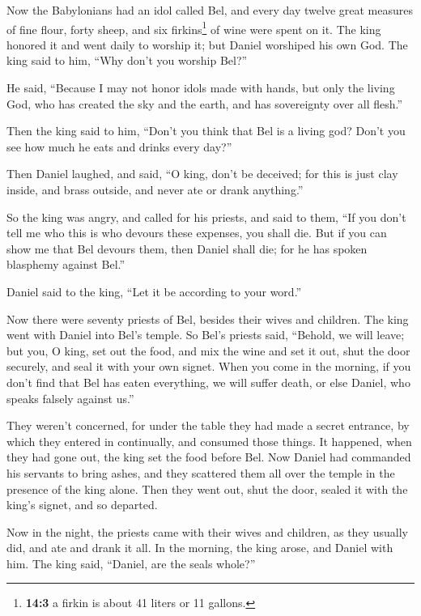  Now the Babylonians had an idol called Bel, and every day
twelve great measures of fine flour, forty sheep, and six
firkins\footnote{\textbf{14:3} a firkin is about 41 liters or 11
  gallons.} of wine were spent on it.  The king honored it
and went daily to worship it; but Daniel worshiped his own God. The king
said to him, ``Why don't you worship Bel?''

 He said, ``Because I may not honor idols made with hands,
but only the living God, who has created the sky and the earth, and has
sovereignty over all flesh.''

 Then the king said to him, ``Don't you think that Bel is
a living god? Don't you see how much he eats and drinks every day?''

 Then Daniel laughed, and said, ``O king, don't be
deceived; for this is just clay inside, and brass outside, and never ate
or drank anything.''

 So the king was angry, and called for his priests, and
said to them, ``If you don't tell me who this is who devours these
expenses, you shall die.  But if you can show me that Bel
devours them, then Daniel shall die; for he has spoken blasphemy against
Bel.''

Daniel said to the king, ``Let it be according to your word.''

 Now there were seventy priests of Bel, besides their
wives and children. The king went with Daniel into Bel's temple.
 So Bel's priests said, ``Behold, we will leave; but you,
O king, set out the food, and mix the wine and set it out, shut the door
securely, and seal it with your own signet.  When you
come in the morning, if you don't find that Bel has eaten everything, we
will suffer death, or else Daniel, who speaks falsely against us.''

 They weren't concerned, for under the table they had
made a secret entrance, by which they entered in continually, and
consumed those things.  It happened, when they had gone
out, the king set the food before Bel. Now Daniel had commanded his
servants to bring ashes, and they scattered them all over the temple in
the presence of the king alone. Then they went out, shut the door,
sealed it with the king's signet, and so departed.

 Now in the night, the priests came with their wives and
children, as they usually did, and ate and drank it all. 
In the morning, the king arose, and Daniel with him.  The
king said, ``Daniel, are the seals whole?''

